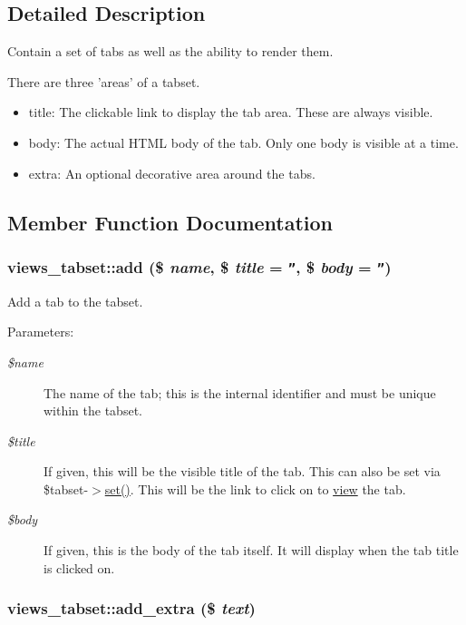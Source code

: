 \subsection{Detailed Description}
Contain a set of tabs as well as the ability to render them.

There are three 'areas' of a tabset.\begin{itemize}
\item title: The clickable link to display the tab area. These are always visible.\item body: The actual HTML body of the tab. Only one body is visible at a time.\item extra: An optional decorative area around the tabs. \end{itemize}


\subsection{Member Function Documentation}
\hypertarget{classviews__tabset_53c8d38fb9e23724d643b94839f3b685}{
\subsubsection[{add}]{\setlength{\rightskip}{0pt plus 5cm}views\_\-tabset::add (\$ {\em name}, \/  \$ {\em title} = {\tt ''}, \/  \$ {\em body} = {\tt ''})}}
\label{classviews__tabset_53c8d38fb9e23724d643b94839f3b685}


Add a tab to the tabset.

\begin{Desc}
\item[Parameters:]
\begin{description}
\item[{\em \$name}]The name of the tab; this is the internal identifier and must be unique within the tabset. \item[{\em \$title}]If given, this will be the visible title of the tab. This can also be set via \$tabset-$>$\hyperlink{classviews__tabset_6a74f667b324b252c1ce316df2974c66}{set()}. This will be the link to click on to \hyperlink{classview}{view} the tab. \item[{\em \$body}]If given, this is the body of the tab itself. It will display when the tab title is clicked on. \end{description}
\end{Desc}
\hypertarget{classviews__tabset_e7e6a38da5921084b76e30e96ac38d95}{
\subsubsection[{add\_\-extra}]{\setlength{\rightskip}{0pt plus 5cm}views\_\-tabset::add\_\-extra (\$ {\em text})}}
\label{classviews__tabset_e7e6a38da5921084b76e30e96ac38d95}


